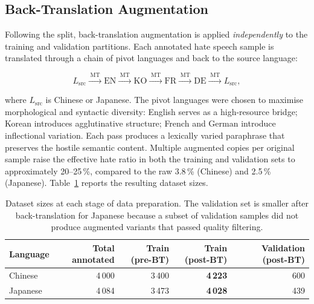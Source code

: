 \documentclass[../CLthesis.tex]{subfiles}
\begin{document}
\subsection{Back-Translation Augmentation}
\label{subsec:app-bt}

Following the split, back-translation augmentation \citep{sennrich-etal-2016-improving} is applied \emph{independently} to the training and validation partitions. Each annotated hate speech sample is translated through a chain of pivot languages and back to the source language:

\begin{equation}
  L_\mathrm{src}
  \xrightarrow{\;\mathrm{MT}\;}
  \mathrm{EN}
  \xrightarrow{\;\mathrm{MT}\;}
  \mathrm{KO}
  \xrightarrow{\;\mathrm{MT}\;}
  \mathrm{FR}
  \xrightarrow{\;\mathrm{MT}\;}
  \mathrm{DE}
  \xrightarrow{\;\mathrm{MT}\;}
  L_\mathrm{src},
  \label{eq:bt-chain}
\end{equation}

\noindent where $L_\mathrm{src}$ is Chinese or Japanese. The pivot languages were chosen to maximise morphological and syntactic diversity: English serves as a high-resource bridge; Korean introduces agglutinative structure; French and German introduce inflectional variation. Each pass produces a lexically varied paraphrase that preserves the hostile semantic content. Multiple augmented copies per original sample raise the effective hate ratio in both the training and validation sets to approximately 20--25\,\%, compared to the raw 3.8\,\% (Chinese) and 2.5\,\% (Japanese). Table~\ref{tab:split-sizes} reports the resulting dataset sizes.

\begin{table}[htbp]
\centering
\small
\begin{tabular}{@{}lrrrr@{}}
\toprule
Language & Total annotated & Train (pre-BT) & \textbf{Train (post-BT)} & Validation (post-BT) \\
\midrule
Chinese  & 4\,000 & 3\,400 & \textbf{4\,223} & 600 \\
Japanese & 4\,084 & 3\,473 & \textbf{4\,028} & 439 \\
\bottomrule
\end{tabular}
\caption{Dataset sizes at each stage of data preparation. The validation set is smaller after back-translation for Japanese because a subset of validation samples did not produce augmented variants that passed quality filtering.}
\label{tab:split-sizes}
\end{table}
\end{document}
